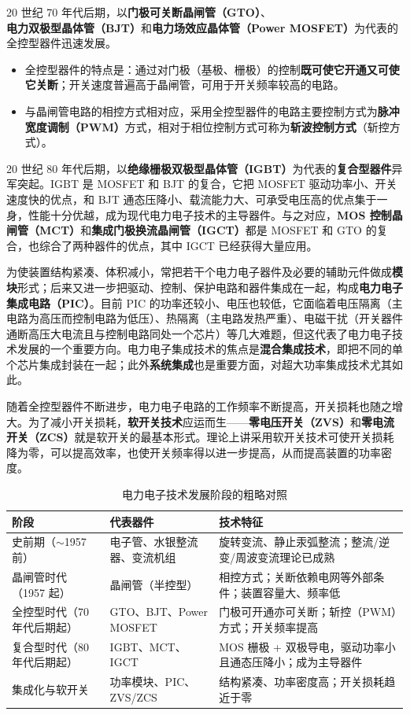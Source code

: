 20 世纪 70 年代后期，以\textbf{门极可关断晶闸管（GTO）}、\textbf{电力双极型晶体管（BJT）}和\textbf{电力场效应晶体管（Power MOSFET）}为代表的全控型器件迅速发展。

\begin{itemize}
  \item 全控型器件的特点是：通过对门极（基极、栅极）的控制\textbf{既可使它开通又可使它关断}；开关速度普遍高于晶闸管，可用于开关频率较高的电路。
  \item 与晶闸管电路的相控方式相对应，采用全控型器件的电路主要控制方式为\textbf{脉冲宽度调制（PWM）}方式，相对于相位控制方式可称为\textbf{斩波控制方式}（斩控方式）。
\end{itemize}

20 世纪 80 年代后期，以\textbf{绝缘栅极双极型晶体管（IGBT）}为代表的\textbf{复合型器件}异军突起。IGBT 是 MOSFET 和 BJT 的复合，它把 MOSFET 驱动功率小、开关速度快的优点，和 BJT 通态压降小、载流能力大、可承受电压高的优点集于一身，性能十分优越，成为现代电力电子技术的主导器件。与之对应，\textbf{MOS 控制晶闸管（MCT）}和\textbf{集成门极换流晶闸管（IGCT）}都是 MOSFET 和 GTO 的复合，也综合了两种器件的优点，其中 IGCT 已经获得大量应用。

为使装置结构紧凑、体积减小，常把若干个电力电子器件及必要的辅助元件做成\textbf{模块}形式；后来又进一步把驱动、控制、保护电路和器件集成在一起，构成\textbf{电力电子集成电路（PIC）}。目前 PIC 的功率还较小、电压也较低，它面临着电压隔离（主电路为高压而控制电路为低压）、热隔离（主电路发热严重）、电磁干扰（开关器件通断高压大电流且与控制电路同处一个芯片）等几大难题，但这代表了电力电子技术发展的一个重要方向。电力电子集成技术的焦点是\textbf{混合集成技术}，即把不同的单个芯片集成封装在一起；此外\textbf{系统集成}也是重要方面，对超大功率集成技术尤其如此。

随着全控型器件不断进步，电力电子电路的工作频率不断提高，开关损耗也随之增大。为了减小开关损耗，\textbf{软开关技术}应运而生——\textbf{零电压开关（ZVS）}和\textbf{零电流开关（ZCS）}就是软开关的最基本形式。理论上讲采用软开关技术可使开关损耗降为零，可以提高效率，也使开关频率得以进一步提高，从而提高装置的功率密度。

\begin{table}[htbp]
\centering
\caption{电力电子技术发展阶段的粗略对照}
\label{tab:1-2}
\begin{tabular}{p{2.6cm}p{4.2cm}p{6.4cm}}
\toprule
\textbf{阶段} & \textbf{代表器件} & \textbf{技术特征} \\
\midrule
史前期（$\sim$1957 前） & 电子管、水银整流器、变流机组 & 旋转变流、静止汞弧整流；整流/逆变/周波变流理论已成熟 \\
晶闸管时代（1957 起） & 晶闸管（半控型） & 相控方式；关断依赖电网等外部条件；装置容量大、频率低 \\
全控型时代（70 年代后期起） & GTO、BJT、Power MOSFET & 门极可开通亦可关断；斩控（PWM）方式；开关频率提高 \\
复合型时代（80 年代后期起） & IGBT、MCT、IGCT & MOS 栅极 + 双极导电，驱动功率小且通态压降小；成为主导器件 \\
集成化与软开关 & 功率模块、PIC、ZVS/ZCS & 结构紧凑、功率密度高；开关损耗趋近于零 \\
\bottomrule
\end{tabular}
\end{table}

